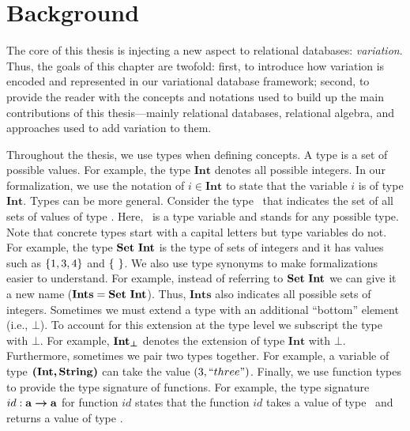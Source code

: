\chapter{Background}
\label{ch:bg}


The core of this thesis is injecting a new aspect to relational databases: \emph{variation}.
Thus, the goals of this chapter are twofold: 
%
first, to introduce how variation is encoded and represented in our variational database framework;
%
second, to provide the reader with the concepts and notations
used to build up the main contributions of this thesis---mainly relational databases,
relational algebra,
%
and approaches used to add variation to them.

%
Throughout the thesis, we use types when defining concepts. 
A type is a set of possible values. For example, the type $\mathbf{Int}$
denotes all possible integers. In our formalization, we use the notation of $i \in \mathbf{Int}$ to
state that the variable $i$ is of type $\mathbf{Int}$. 
%
Types can be more general. Consider the type \settype \typevar\ that indicates the set of all sets
 of values of type \typevar. Here, \typevar\ is a type variable and stands for any possible type. 
Note that concrete types start with a capital letters but type variables do not.
For example, the type $\settype {\mathbf{Int}}$ is the type of
sets of integers and it has values such as $\setDef {1,3,4}$ and $\setDef {\ }$.
We also use type synonyms to make formalizations easier to understand. 
For example, instead of referring to
$\settype {\mathbf{Int}}$ we can give it a new name ($\mathbf{Ints}= \settype {\mathbf{Int}}$).
Thus,  $\mathbf{Ints}$ also indicates all possible sets of integers.
%
Sometimes we must extend a type with an additional ``bottom'' element (i.e., $\bot$). To account for this
extension at the type level we subscript the type with $\bot$. For example, $\maybe {\mathbf{Int}}$
denotes the extension of  type $\mathbf{Int}$ with $\bot$.
%
Furthermore, sometimes we pair two types together. For example, a variable of type $\typepair{\mathbf{Int}} {\mathbf{String}}$ can take the value $(3,``three")$. 
%
Finally, we use function types to provide the type signature of functions. For example,
the type signature $id : \typevar \totype \typevar$ for function $id$ states that the function $id$ takes a value of
type \typevar\ and returns a value of type \typevar. 

